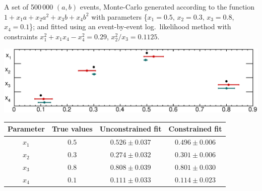 A set of 500\,000 $(a,b)$ events, Monte-Carlo generated according to the function
\(1 + x_1a + x_2a^2 + x_3b + x_4b^2\)
with parameters
\{$x_1 = 0.5$, $x_2 = 0.3$, $x_3 = 0.8$, $x_4 = 0.1$\};
and fitted using an event-by-event log.\ likelihood method with constraints
\(x_1^2 + x_1x_4 - x_4^2 = 0.29\), \(x_2^2/x_3 = 0.1125\).

\includegraphics[width=1\textwidth]{pics/drawToy.eps}

\begin{tabular*}{1\textwidth}{@{\extracolsep{\fill}}cccc}\hline\hline
Parameter & True values & Unconstrained fit & Constrained fit \\\hline
$x_1$ & $0.5$ & $0.526 \pm 0.037$ & $0.496 \pm 0.006$ \\
$x_2$ & $0.3$ & $0.274 \pm 0.032$ & $0.301 \pm 0.006$ \\
$x_3$ & $0.8$ & $0.808 \pm 0.039$ & $0.801 \pm 0.030$ \\
$x_4$ & $0.1$ & $0.111 \pm 0.033$ & $0.114 \pm 0.023$ \\\hline\hline
\end{tabular*}
